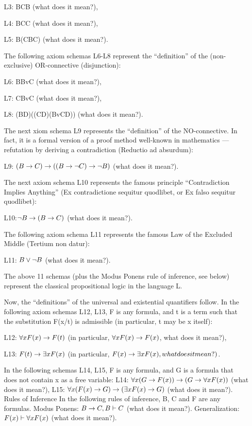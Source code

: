 L3: B\AND C\IMPLIES B (what does it mean?),

L4: B\AND C\IMPLIES C (what does it mean?),

L5: B\IMPLIES (C\IMPLIES B\AND C) (what does it mean?).

The following axiom schemas L6-L8 represent the ``definition'' of the (non-exclusive) OR-connective (disjunction):

L6: B\IMPLIES BvC (what does it mean?),

L7: C\IMPLIES BvC (what does it mean?),

L8: (B\IMPLIES D)\IMPLIES ((C\IMPLIES D)\IMPLIES (BvC\IMPLIES D)) (what does it mean?).

The next xiom schema L9 represents the ``definition'' of the NO-connective. In fact, it is a formal version of a proof method well-known in mathematics --- refutation by deriving a contradiction (Reductio ad absurdum):

L9: \((B\rightarrow C)\rightarrow ((B\rightarrow \neg C)\rightarrow \neg B)\) (what does it mean?).

The next axiom schema L10 represents the famous principle ``Contradiction Implies Anything'' (Ex contradictione sequitur quodlibet, or Ex falso sequitur quodlibet):

L10:\( \neg B\rightarrow (B\rightarrow C)\) (what does it mean?).

The following axiom schema L11 represents the famous Law of the Excluded Middle (Tertium non datur):

L11: \(B\vee\neg B\) (what does it mean?).

The above 11 schemas (plus the Modus Ponens rule of inference, see below) represent the classical propositional logic in the language L.

Now, the ``definitions'' of the universal and existential quantifiers follow.
In the following axiom schemas L12, L13, F is any formula, and t is a term such that the substitution F(x/t)
is admissible (in particular, t may be x itself):

L12: \(\forall xF(x)\rightarrow F(t)\) (in particular, \(\forall xF(x)\rightarrow F(x)\), what does it mean?),

L13: \(F(t)\rightarrow \exists xF(x)\) (in particular, \(F(x)\rightarrow \exists xF(x), what does it mean?)\).

In the following schemas L14, L15, F is any formula, and G is a formula that does not contain x as a free
variable:
L14: \(\forall x(G\rightarrow F(x))\rightarrow (G\rightarrow \forall xF(x))\) (what does it mean?),
L15: \(\forall x(F(x)\rightarrow G)\rightarrow (\exists xF(x)\rightarrow G)\) (what does it mean?).
Rules of Inference
In the following rules of inference, B, C and F are any formulas.
Modus Ponens: \(B\rightarrow C, B \vdash C\) (what does it mean?).
Generalization: \(F(x)\vdash \forall xF(x)\) (what does it mean?).

